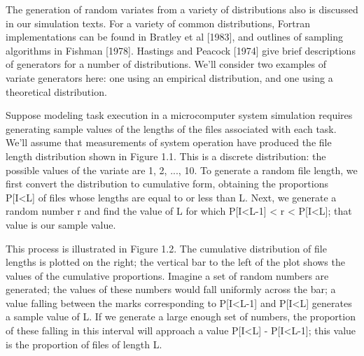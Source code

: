 The generation of random variates from a variety of distributions also is
discussed in our simulation texts. For a variety of common distributions,
Fortran implementations can be found in Bratley et al [1983], and outlines of
sampling algorithms in Fishman [1978]. Hastings and Peacock [1974] give brief
descriptions of generators for a number of distributions. We'll consider two
examples of variate generators here: one using an empirical distribution, and
one using a theoretical distribution.

Suppose modeling task execution in a microcomputer system simulation requires
generating sample values of the lengths of the files associated with each task.
We'll assume that measurements of system operation have produced the file
length distribution shown in Figure 1.1. This is a discrete distribution: the
possible values of the variate are 1, 2, ..., 10. To generate a random file
length, we first convert the distribution to cumulative form, obtaining the
proportions P[I<L] of files whose lengths are equal to or less than L. Next, we
generate a random number r and find the value of L for which P[I<L-1] < r <
P[I<L]; that value is our sample value.

This process is illustrated in Figure 1.2. The cumulative distribution of file
lengths is plotted on the right; the vertical bar to the left of the plot shows
the values of the cumulative proportions. Imagine a set of random numbers are
generated; the values of these numbers would fall uniformly across the bar; a
value falling between the marks corresponding to P[I<L-1] and P[I<L] generates
a sample value of L. If we generate a large enough set of numbers, the
proportion of these falling in this interval will approach a value P[I<L] -
P[I<L-1]; this value is the proportion of files of length L.

